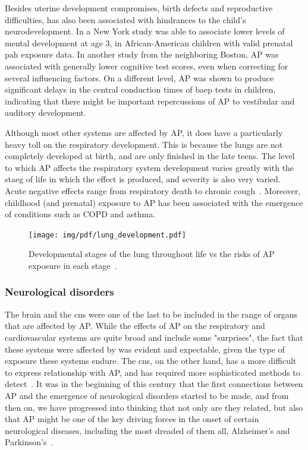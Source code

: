 Besides uterine development compromises, birth defects and reproductive
difficulties,  has also been associated with hindrances to
the child's neurodevelopment. In a New York study was able to associate
lower levels of mental development at age 3, in African-American
children with valid prenatal \gls{pah} exposure data. In another study
from the neighboring Boston, \gls{AP} was associated with generally lower
cognitive test scores, even when correcting for several influencing
factors. On a different level, \gls{AP} was shown to produce significant
delays in the central conduction times of \gls{baep} tests in children,
indicating that there might be important repercussions of \gls{AP} to
vestibular and auditory development.

Although most other systems are affected by \gls{AP}, it does have a
particularly heavy toll on the respiratory development. This is because
the lungs are not completely developed at birth, and are only finished
in the late teens. The level to which \gls{AP} affects the respiratory
system development varies greatly with the staeg of life in which the
effect is produced, and severity is also very varied. Acute negative
effects range from respiratory death to chronic
cough~\cite{Vallero2014}. Moreover, childhood (and prenatal) exposure to
\gls{AP} has been associated with the emergence of conditions such as
\gls{COPD} and asthma.

\begin{figure}[htpb]
    \centering
    \texttt{[image: img/pdf/lung\_development.pdf]}
    \caption{Developmental stages of the lung throughout life vs the
    risks of \gls{AP} exposure in each stage~\cite{Vallero2014}.}
    \label{fig:img/lung_development}
\end{figure}

\subsubsection{Neurological disorders}%
\label{ssub:neurological_disorders}

The brain and the \gls{cns} were one of the last to be included in the
range of organs that are affected by \gls{AP}. While the effects of
\gls{AP} on the respiratory and cardiovascular systems are quite broad
and include some "surprises", the fact that these systems were affected
by  was evident and expectable, given the type of exposure
these systems endure. The \gls{cns}, on the other hand, has a more
difficult to express relationship with \gls{AP}, and has required more
sophisticated methods to detect~\cite{Vallero2014, Genc2012}. It was in
the beginning of this century that the first connections between
\gls{AP} and the emergence of neurological disorders started to be made,
and from then on, we have progressed into thinking that not only are
they related, but also that \gls{AP} might be one of the key driving
forces in the onset of certain neurological diseases, including the most
dreaded of them all, Alzheimer's and Parkinson's~\cite{Genc2012,
DePradoBert2018, Calderon-Garciduenas2014}.

